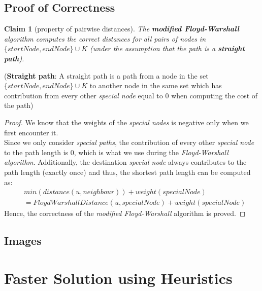\documentclass[12pt]{report}
\newtheorem{claim}[theorem]{Claim}
\begin{document}
\section {Proof of Correctness}
\label{sec:brute-correctness}
\begin{claim}[property of pairwise distances]
\label{claim:dist-prop}
The \textbf{modified Floyd-Warshall} algorithm computes the correct distances for all pairs of nodes in $\{{startNode}, {endNode}\} \cup K$ (under the assumption that the path is a \textbf{straight path}).
\end{claim}
\noindent(\textbf{Straight path}: A straight path is a path from a node in the set $\{{startNode}, {endNode}\} \cup K$ to another node in the same set which has contribution from every other \textit{special node} equal to $0$ when computing the cost of the path)
\begin{proof}
We know that the weights of the \textit{special nodes} is negative only when we first encounter it.\\
Since we only consider \textit{special paths}, the contribution of every other \textit{special node} to the path length is $0$, which is what we use during the \textit{Floyd-Warshall algorithm}. Additionally, the destination \textit{special node} always contributes to the path length (exactly once) and thus, the shortest path length can be computed as:
\begin{equation}
\begin{aligned}
    &{min}({distance}(u, neighbour)) + {weight}({specialNode})\\
    &= {FloydWarshallDistance}(u, {specialNode}) + {weight}({specialNode})
\end{aligned}
\end{equation}
Hence, the correctness of the \textit{modified Floyd-Warshall} algorithm is proved.
\end{proof}

\section{Images}

\chapter{Faster Solution using Heuristics}
\end{document}
